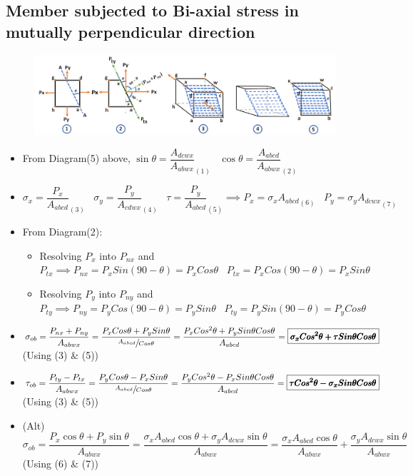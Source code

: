 \documentclass[8pt]{report}
\begin{document}
	\subsection{Member subjected to Bi-axial stress in mutually perpendicular direction}
		\begin{figure}[H]
				\hspace{-0.7cm}
				\includegraphics[scale=0.45]{case2a.png}
		\end{figure}
		\begin{itemize}
			\item From Diagram(5) above, $\boxed{\sin\theta = \dfrac{A_{dcwx}}{A_{abwx}}}_{(1)}\;\;\;\boxed{\cos\theta = \dfrac{A_{abcd}}{A_{abwx}}}_{(2)}$	
			\item $\boxed{\sigma_x=\dfrac{P_x}{A_{abcd}}}_{(3)}\;\;\;\boxed{\sigma_y = \dfrac{P_y}{A_{cdwx}}}_{(4)}\;\;\;\boxed{\tau=\dfrac{P_y}{A_{abcd}}}_{(5)}\implies\boxed{P_x=\sigma_x A_{abcd}}_{(6)}\;\;\;\boxed{P_y=\sigma_y A_{dcwx}}_{(7)}$
			\item From Diagram(2):
			\begin{itemize}
				\item Resolving $P_x$ into $P_{nx}$ and $P_{tx} \implies \boxed{P_{nx} = P_xSin(90-\theta) = P_xCos\theta}\;\;\;\boxed{P_{tx} = P_xCos(90-\theta) = P_xSin\theta}$
				\item Resolving $P_y$ into $P_{ny}$ and $P_{ty} \implies \boxed{P_{ny} = P_yCos(90-\theta) = P_ySin\theta}\;\;\;\boxed{P_{ty} = P_ySin(90-\theta) = P_yCos\theta}$
			\end{itemize}							
			\item $\sigma_{ob} = \dfrac{P_{nx} + P_{ny}}{A_{abwx}} = \dfrac{P_xCos\theta + P_ySin\theta}{\sfrac{A_{abcd}}{Cos\theta}} = \dfrac{P_xCos^2\theta + P_ySin\theta Cos\theta}{A_{abcd}} = \boxed{\pmb{\sigma_x Cos^2\theta + \tau Sin\theta Cos\theta}}$ (Using (3) \& (5))
			\item $\tau_{ob} = \dfrac{P_{ty} - P_{tx}}{A_{abwx}} = \dfrac{P_yCos\theta - P_xSin\theta}{\sfrac{A_{abcd}}{Cos\theta}} = \dfrac{P_yCos^2\theta - P_xSin\theta Cos\theta}{A_{abcd}} = \boxed{\pmb{\tau Cos^2\theta -\sigma_x Sin\theta Cos\theta}}$ (Using (3) \& (5))		
			\item (Alt)$\sigma_{ob} = \dfrac{P_x\cos\theta + P_y\sin\theta}{A_{abwx}} = \dfrac{\sigma_xA_{abcd}\cos\theta + \sigma_yA_{dcwx}\sin\theta}{A_{abwx}} = \dfrac{\sigma_xA_{abcd}\cos\theta}{A_{abwx}}+\dfrac{\sigma_yA_{dcwx}\sin\theta}{A_{abwx}}$ (Using (6) \& (7))

\end{itemize}
\end{document}
